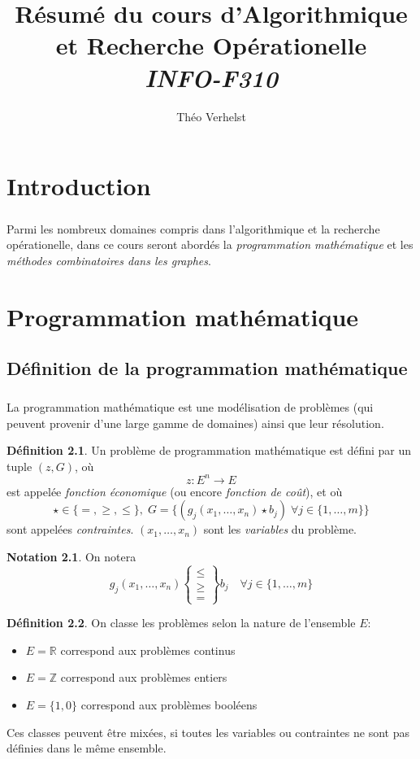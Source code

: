 \documentclass[a4paper]{report}
\author{Théo Verhelst}
\title{Résumé du cours d'Algorithmique et Recherche Opérationelle\\
\emph{INFO-F310}}
\theoremstyle{definition}
\newtheorem*{definition}{Définition}
\newtheorem*{notation}{Notation}
\theoremstyle{remark}
\theoremstyle{plain}
\begin{document}
\maketitle
\tableofcontents

\chapter{Introduction}
\paragraph{}
Parmi les nombreux domaines compris dans l'algorithmique et la recherche
opérationelle, dans ce cours seront abordés la \emph{programmation mathématique}
et les \emph{méthodes combinatoires dans les graphes}.

\chapter{Programmation mathématique}
\section{Définition de la programmation mathématique}
\paragraph{}
La programmation mathématique est une modélisation de problèmes (qui peuvent
provenir d'une large gamme de domaines) ainsi que leur résolution.

\begin{definition}
Un problème de programmation mathématique est défini
par un tuple \((z, G)\), où
\[z:E^n\to E\]
est appelée \emph{fonction économique} (ou encore \emph{fonction de coût}), et
où \[\star\in\{=,\ge,\le\},\;G=\{(g_j(x_1,\dots,x_n)\star b_j)\;\forall
j\in\{1,\dots,m\}\}\] sont appelées \emph{contraintes}.
\((x_1,\dots,x_n)\) sont les \emph{variables} du problème.
\end{definition}

\begin{notation}
On notera
\[g_j(x_1,\dots,x_n)\begin{Bmatrix}\le\\\ge\\=\end{Bmatrix}b_j\quad\forall
j\in\{1,\dots,m\}\]
\end{notation}

\begin{definition}
On classe les problèmes selon la nature de l'ensemble
\(E\):
\begin{itemize}
	\item \(E=\mathbb{R}\) correspond aux problèmes continus
	\item \(E=\mathbb{Z}\) correspond aux problèmes entiers
	\item \(E=\{1,0\}\) correspond aux problèmes booléens
\end{itemize}
Ces classes peuvent être mixées, si toutes les variables ou contraintes ne sont
pas définies dans le même ensemble.
\end{definition}
\end{document}
